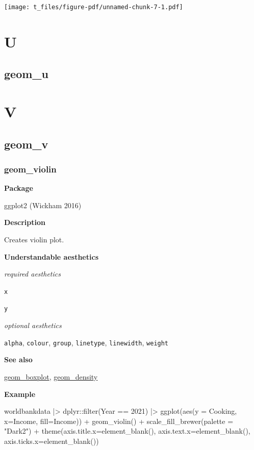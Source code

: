 \documentclass[
  letterpaper,
  DIV=11,
  numbers=noendperiod]{scrreprt}
\newenvironment{Shaded}{\begin{snugshade}}{\end{snugshade}}
\newcommand{\AttributeTok}[1]{\textcolor[rgb]{0.40,0.45,0.13}{#1}}
\newcommand{\DecValTok}[1]{\textcolor[rgb]{0.68,0.00,0.00}{#1}}
\newcommand{\FunctionTok}[1]{\textcolor[rgb]{0.28,0.35,0.67}{#1}}
\newcommand{\NormalTok}[1]{\textcolor[rgb]{0.00,0.23,0.31}{#1}}
\newcommand{\SpecialCharTok}[1]{\textcolor[rgb]{0.37,0.37,0.37}{#1}}
\newcommand{\StringTok}[1]{\textcolor[rgb]{0.13,0.47,0.30}{#1}}
\begin{document}
\texttt{[image: t\_files/figure-pdf/unnamed-chunk-7-1.pdf]}

\part{U}

\chapter{geom\_u}\label{sec-u}

\part{V}

\chapter{geom\_v}\label{sec-v}

\section{geom\_violin}\label{violin}

\textbf{Package}

ggplot2 (Wickham 2016)

\textbf{Description}

Creates violin plot.

\textbf{Understandable aesthetics}

\emph{required aesthetics}

\texttt{x}

\texttt{y}

\emph{optional aesthetics}

\texttt{alpha}, \texttt{colour}, \texttt{group}, \texttt{linetype},
\texttt{linewidth}, \texttt{weight}

\textbf{See also}

\hyperref[boxplot]{geom\_boxplot}, \hyperref[density]{geom\_density}

\textbf{Example}

\begin{Shaded}
\begin{Highlighting}[]
\NormalTok{worldbankdata }\SpecialCharTok{|\textgreater{}}
\NormalTok{  dplyr}\SpecialCharTok{::}\FunctionTok{filter}\NormalTok{(Year }\SpecialCharTok{==} \DecValTok{2021}\NormalTok{) }\SpecialCharTok{|\textgreater{}}
\FunctionTok{ggplot}\NormalTok{(}\FunctionTok{aes}\NormalTok{(}\AttributeTok{y =}\NormalTok{ Cooking, }\AttributeTok{x=}\NormalTok{Income, }\AttributeTok{fill=}\NormalTok{Income)) }\SpecialCharTok{+} 
  \FunctionTok{geom\_violin}\NormalTok{() }\SpecialCharTok{+} 
  \FunctionTok{scale\_fill\_brewer}\NormalTok{(}\AttributeTok{palette =} \StringTok{"Dark2"}\NormalTok{) }\SpecialCharTok{+}
  \FunctionTok{theme}\NormalTok{(}\AttributeTok{axis.title.x=}\FunctionTok{element\_blank}\NormalTok{(),}
        \AttributeTok{axis.text.x=}\FunctionTok{element\_blank}\NormalTok{(),}
        \AttributeTok{axis.ticks.x=}\FunctionTok{element\_blank}\NormalTok{())}
\end{Highlighting}
\end{Shaded}
\end{document}
